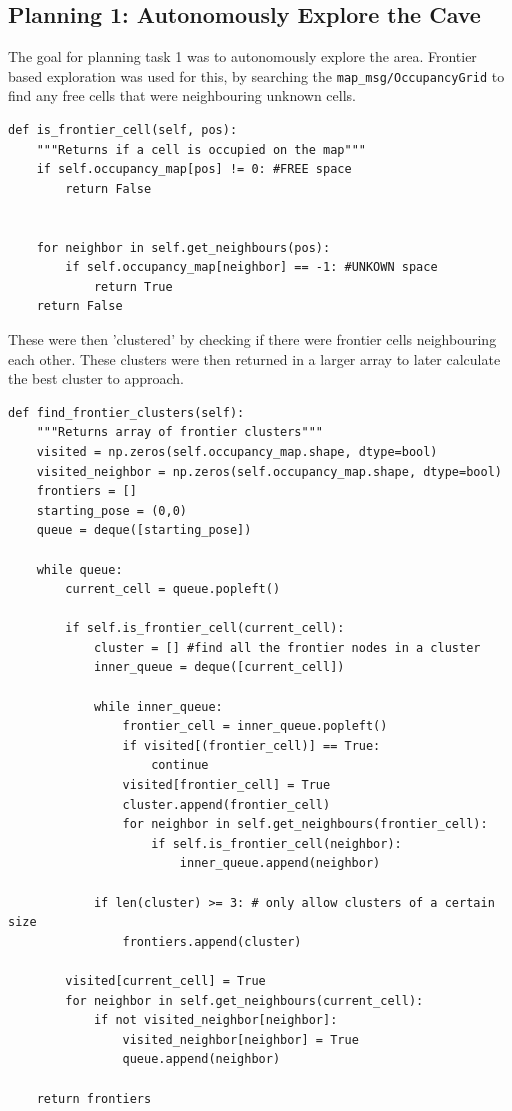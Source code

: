 \documentclass[a4paper,11pt]{article}
\begin{document}
\subsection{Planning 1: Autonomously Explore the Cave}
The goal for planning task 1 was to autonomously explore the area. Frontier based exploration was used for this, by searching the \texttt{map\_\allowbreak msg/OccupancyGrid} to find any free cells that were neighbouring unknown cells.

\begin{lstlisting}[caption={Frontier cell detection from occupany grid}, label={lst:planning-frontier-detection}]
def is_frontier_cell(self, pos):
    """Returns if a cell is occupied on the map"""
    if self.occupancy_map[pos] != 0: #FREE space
        return False

    
    for neighbor in self.get_neighbours(pos):
        if self.occupancy_map[neighbor] == -1: #UNKOWN space
            return True
    return False
\end{lstlisting}

\newpage

These were then 'clustered' by checking if there were frontier cells neighbouring each other.
These clusters were then returned in a larger array to later calculate the best cluster to approach.

\begin{lstlisting}[caption={Frontier cell clustering}, label={lst:planning-frontier-clustering}]
def find_frontier_clusters(self):
    """Returns array of frontier clusters"""
    visited = np.zeros(self.occupancy_map.shape, dtype=bool)
    visited_neighbor = np.zeros(self.occupancy_map.shape, dtype=bool)
    frontiers = []
    starting_pose = (0,0)
    queue = deque([starting_pose])

    while queue:
        current_cell = queue.popleft()

        if self.is_frontier_cell(current_cell):
            cluster = [] #find all the frontier nodes in a cluster
            inner_queue = deque([current_cell])

            while inner_queue:
                frontier_cell = inner_queue.popleft()
                if visited[(frontier_cell)] == True:
                    continue
                visited[frontier_cell] = True
                cluster.append(frontier_cell)
                for neighbor in self.get_neighbours(frontier_cell):
                    if self.is_frontier_cell(neighbor):
                        inner_queue.append(neighbor)

            if len(cluster) >= 3: # only allow clusters of a certain size
                frontiers.append(cluster)

        visited[current_cell] = True
        for neighbor in self.get_neighbours(current_cell):
            if not visited_neighbor[neighbor]:
                visited_neighbor[neighbor] = True
                queue.append(neighbor)
    
    return frontiers
\end{lstlisting}
\end{document}
